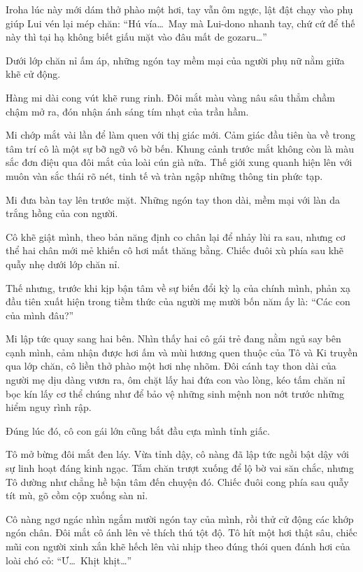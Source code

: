 \documentclass[../main.tex]{subfiles}
\begin{document}
Iroha lúc này mới dám thở phào một hơi, tay vẫn ôm ngực, lật đật chạy vào phụ giúp Lui vén lại mép chăn: ``Hú vía\dots\ May mà Lui-dono nhanh tay, chứ cứ để thế này thì tại hạ không biết giấu mặt vào đâu mất de gozaru\dots''

\ct


Dưới lớp chăn nỉ ấm áp, những ngón tay mềm mại của người phụ nữ nằm giữa khẽ cử động.

Hàng mi dài cong vút khẽ rung rinh. Đôi mắt màu vàng nâu sâu thẳm chầm chậm mở ra, đón nhận ánh sáng tím nhạt của trần hầm.

Mi chớp mắt vài lần để làm quen với thị giác mới. Cảm giác đầu tiên ùa về trong tâm trí cô là một sự bỡ ngỡ vô bờ bến. Khung cảnh trước mắt không còn là màu sắc đơn điệu qua đôi mắt của loài cún già nữa. Thế giới xung quanh hiện lên với muôn vàn sắc thái rõ nét, tinh tế và tràn ngập những thông tin phức tạp.

Mi đưa bàn tay lên trước mặt. Những ngón tay thon dài, mềm mại với làn da trắng hồng của con người.

Cô khẽ giật mình, theo bản năng định co chân lại để nhảy lùi ra sau, nhưng cơ thể hai chân mới mẻ khiến cô hơi mất thăng bằng. Chiếc đuôi xù phía sau khẽ quẫy nhẹ dưới lớp chăn nỉ.

Thế nhưng, trước khi kịp bận tâm về sự biến đổi kỳ lạ của chính mình, phản xạ đầu tiên xuất hiện trong tiềm thức của người mẹ mười bốn năm ấy là: ``Các con của mình đâu?''

Mi lập tức quay sang hai bên. Nhìn thấy hai cô gái trẻ đang nằm ngủ say bên cạnh mình, cảm nhận được hơi ấm và mùi hương quen thuộc của Tô và Ki truyền qua lớp chăn, cô liền thở phào một hơi nhẹ nhõm. Đôi cánh tay thon dài của người mẹ dịu dàng vươn ra, ôm chặt lấy hai đứa con vào lòng, kéo tấm chăn nỉ bọc kín lấy cơ thể chúng như để bảo vệ những sinh mệnh non nớt trước những hiểm nguy rình rập.

Đúng lúc đó, cô con gái lớn cũng bắt đầu cựa mình tỉnh giấc.

Tô mở bừng đôi mắt đen láy. Vừa tỉnh dậy, cô nàng đã lập tức ngồi bật dậy với sự linh hoạt đáng kinh ngạc. Tấm chăn trượt xuống để lộ bờ vai săn chắc, nhưng Tô dường như chẳng hề bận tâm đến chuyện đó. Chiếc đuôi cong phía sau quẫy tít mù, gõ cồm cộp xuống sàn nỉ.

Cô nàng ngơ ngác nhìn ngắm mười ngón tay của mình, rồi thử cử động các khớp ngón chân. Đôi mắt cô ánh lên vẻ thích thú tột độ. Tô hít một hơi thật sâu, chiếc mũi con người xinh xắn khẽ hếch lên vài nhịp theo đúng thói quen đánh hơi của loài chó cỏ: ``Ư\dots\ Khịt khịt\dots''
\end{document}
